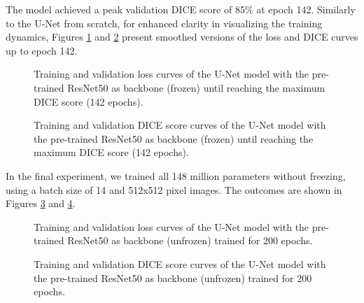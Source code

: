 The model achieved a peak validation DICE score of 85\% at epoch 142. Similarly to the U-Net from scratch, 
for enhanced clarity in visualizing the training dynamics, Figures \ref{fig:renet50_frozen_loss_curve_smooth} and 
\ref{fig:renet50_frozen_dice_curve_smooth} present smoothed versions of the loss and DICE curves up to epoch 142.

\begin{figure}[ht]
    \centering
    \caption{Training and validation loss curves of the U-Net model with the pre-trained ResNet50 as backbone (frozen) until reaching the maximum DICE score (142 epochs).}
    \label{fig:renet50_frozen_loss_curve_smooth}
\end{figure}

\begin{figure}[H]
    \centering
    \caption{Training and validation DICE score curves of the U-Net model with the pre-trained ResNet50 as backbone (frozen) until reaching the maximum DICE score (142 epochs).}
    \label{fig:renet50_frozen_dice_curve_smooth}
\end{figure}

In the final experiment, we trained all 148 million parameters without freezing, using a batch size of 14 and 512x512 pixel images. The outcomes are shown in Figures \ref{fig:renet50_unfrozen_loss_curve} and \ref{fig:renet50_unfrozen_dice_curve}.


\begin{figure}[ht]
    \centering
    \caption{Training and validation loss curves of the U-Net model with the pre-trained ResNet50 as backbone (unfrozen) trained for 200 epochs.}
    \label{fig:renet50_unfrozen_loss_curve}
\end{figure}

\begin{figure}[ht]
    \centering
    \caption{Training and validation DICE score curves of the U-Net model with the pre-trained ResNet50 as backbone (unfrozen) trained for 200 epochs.}
    \label{fig:renet50_unfrozen_dice_curve}
\end{figure}

